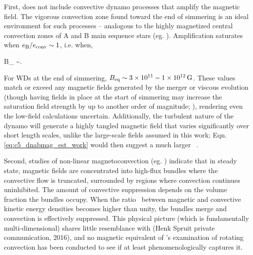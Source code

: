 
First, \citeal{stev79} does not include convective dynamo processes that amplify the magnetic field.  The vigorous convection zone found toward the end of simmering is an ideal environment for such processes -- analogous to the highly magnetized central convection zones of A and B main sequence stars (eg. \citealt{brunbt05, feat+09, augubt16}).  Amplification saturates when $\EBEconv \sim 1$, i.e. when, 

\eqbegin
B_ \sim \vconv\sqrt{8\pi\rho}.
\eqend

\noindent For WDs at the end of simmering, $B_\mathrm{eq} \sim 3\times10^{11}-1\times10^{12}\,\mathrm{G}$.  These values match or exceed any magnetic fields generated by the merger or viscous evolution (though having fields in place at the start of simmering may increase the saturation field strength by up to another order of magnitude; \citealt{feat+09}), rendering even the low-field calculations uncertain.  Additionally, the turbulent nature of the dynamo will generate a highly tangled magnetic field that varies significantly over short length scales, unlike the large-scale fields assumed in this work; Eqn. \ref{eq:c5_dnabmag_est_work} would then suggest a much larger \dnabmag\ \citep{chabgb07}.

Second, studies of non-linear magnetoconvection (eg. \citealt{procw82}) indicate that in steady state, magnetic fields are concentrated into high-flux bundles where the convective flow is truncated, surrounded by regions where convection continues uninhibited.  The amount of convective suppression depends on the volume fraction the bundles occupy.  When the ratio \EBEconv\ between magnetic and convective kinetic energy densities becomes higher than unity, the bundles merge and convection is effectively suppressed.  This physical picture (which is fundamentally multi-dimensional) shares little resemblance with \citeal{stev79} (Henk Spruit private communication, 2016), and no magnetic equivalent of \cite{barkdl14}'s examination of rotating convection has been conducted to see if \citeal{stev79} at least phenomenologically captures it.


